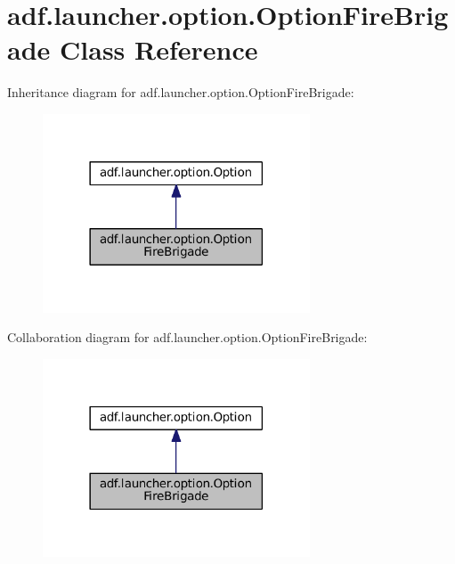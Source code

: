 \hypertarget{classadf_1_1launcher_1_1option_1_1OptionFireBrigade}{}\section{adf.\+launcher.\+option.\+Option\+Fire\+Brigade Class Reference}
\label{classadf_1_1launcher_1_1option_1_1OptionFireBrigade}


Inheritance diagram for adf.\+launcher.\+option.\+Option\+Fire\+Brigade\+:
\nopagebreak
\begin{figure}[H]
\begin{center}
\leavevmode
\includegraphics[width=225pt]{classadf_1_1launcher_1_1option_1_1OptionFireBrigade__inherit__graph}
\end{center}
\end{figure}


Collaboration diagram for adf.\+launcher.\+option.\+Option\+Fire\+Brigade\+:
\nopagebreak
\begin{figure}[H]
\begin{center}
\leavevmode
\includegraphics[width=225pt]{classadf_1_1launcher_1_1option_1_1OptionFireBrigade__coll__graph}
\end{center}
\end{figure}
